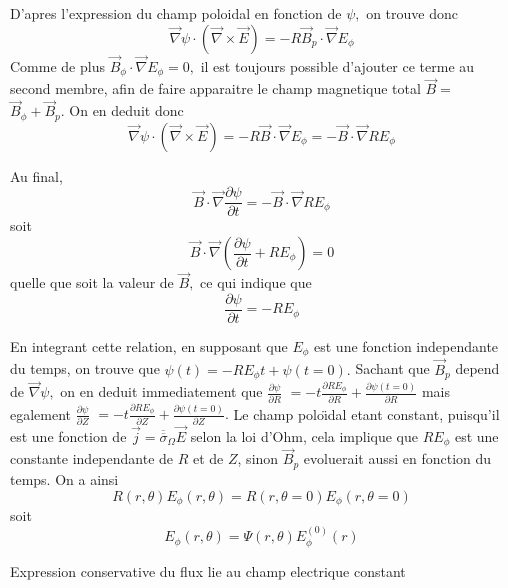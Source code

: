 D'apres l'expression du champ poloidal en fonction de $\psi,$ on
trouve donc \[
\overrightarrow{\nabla}\psi\cdot\left(\overrightarrow{\nabla}\times\overrightarrow{E}\right)=-R\overrightarrow{B}_{p}\cdot\overrightarrow{\nabla}E_{\phi}\]
 Comme de plus $\overrightarrow{B}_{\phi}\cdot\overrightarrow{\nabla}E_{\phi}=0,$
il est toujours possible d'ajouter ce terme au second membre, afin
de faire apparaitre le champ magnetique total $\overrightarrow{B}=$
$\overrightarrow{B}_{\phi}+\overrightarrow{B}_{p}.$ On en deduit
donc \[
\overrightarrow{\nabla}\psi\cdot\left(\overrightarrow{\nabla}\times\overrightarrow{E}\right)=-R\overrightarrow{B}\cdot\overrightarrow{\nabla}E_{\phi}=-\overrightarrow{B}\cdot\overrightarrow{\nabla}RE_{\phi}\]


Au final, \[
\overrightarrow{B}\cdot\overrightarrow{\nabla}\frac{\partial\psi}{\partial t}=-\overrightarrow{B}\cdot\overrightarrow{\nabla}RE_{\phi}\]
 soit \[
\overrightarrow{B}\cdot\overrightarrow{\nabla}\left(\frac{\partial\psi}{\partial t}+RE_{\phi}\right)=0\]
 quelle que soit la valeur de $\overrightarrow{B},$ ce qui indique
que \[
\frac{\partial\psi}{\partial t}=-RE_{\phi}\]


En integrant cette relation, en supposant que $E_{\phi}$ est une
fonction independante du temps, on trouve que $\psi\left(t\right)=-RE_{\phi}t+\psi\left(t=0\right).$
Sachant que $\overrightarrow{B}_{p}$ depend de $\overrightarrow{\nabla}\psi,$
on en deduit immediatement que $\frac{\partial\psi}{\partial R}$
$=-t\frac{\partial RE_{\phi}}{\partial R}+\frac{\partial\psi\left(t=0\right)}{\partial R}$
mais egalement $\frac{\partial\psi}{\partial Z}$ $=-t\frac{\partial RE_{\phi}}{\partial Z}+\frac{\partial\psi\left(t=0\right)}{\partial Z}.$
Le champ polo\"{\i}dal etant constant, puisqu'il est une fonction
de $\overrightarrow{j}=\overline{\overline{\sigma}}_{\Omega}\overrightarrow{E}$
selon la loi d'Ohm, cela implique que $RE_{\phi}$ est une constante
independante de $R$ et de $Z$, sinon $\overrightarrow{B}_{p}$ evoluerait
aussi en fonction du temps. On a ainsi \[
R\left(r,\theta\right)E_{\phi}\left(r,\theta\right)=R\left(r,\theta=0\right)E_{\phi}\left(r,\theta=0\right)\]
 soit \[
E_{\phi}\left(r,\theta\right)=\Psi\left(r,\theta\right)E_{\phi}^{(0)}\left(r\right)\]


Expression conservative du flux lie au champ electrique constant

